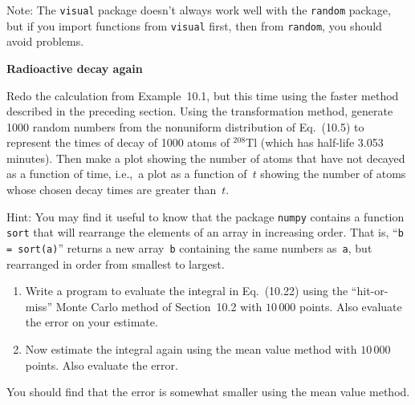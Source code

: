 \documentclass[12pt]{article}
\begin{document}
\begin{exercises}
Note: The \verb|visual| package doesn't always work well with the
\verb|random| package, but if you import functions from \verb|visual|
first, then from \verb|random|, you should avoid problems.



\exercise \textbf{Radioactive decay again}

\exskip Redo the calculation from Example~10.1, but this time using the
faster method described in the preceding section.  Using the transformation
method, generate 1000 random numbers from the nonuniform distribution of
Eq.~(10.5) to represent the times of decay of 1000 atoms of $^{208}$Tl
(which has half-life 3.053 minutes).  Then make a plot showing the number
of atoms that have not decayed as a function of time, i.e.,~a plot as a
function of~$t$ showing the number of atoms whose chosen decay times are
greater than~$t$.

Hint: You may find it useful to know that the package \verb|numpy| contains
a function \verb|sort| that will rearrange the elements of an array
in increasing order.  That is, ``\verb|b = sort(a)|'' returns a new
array~\verb|b| containing the same numbers as~\verb|a|, but rearranged in
order from smallest to largest.



\exercise
\begin{enumerate}\setlength{\itemsep}{0pt}
\item Write a program to evaluate the integral in Eq.~(10.22) using the
  ``hit-or-miss'' Monte Carlo method of Section~10.2 with $10\,000$ points.
  Also evaluate the error on your estimate.
\item Now estimate the integral again using the mean value method with
  $10\,000$ points.  Also evaluate the error.
\end{enumerate}
You should find that the error is somewhat smaller using the mean value
method.




\end{exercises}
\end{document}
